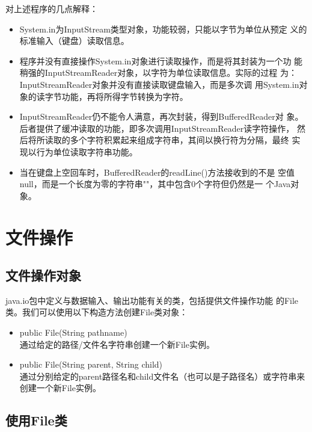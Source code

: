对上述程序的几点解释：

\begin{itemize}
\item System.in为InputStream类型对象，功能较弱，只能以字节为单位从预定
  义的标准输入（键盘）读取信息。
\item 程序并没有直接操作System.in对象进行读取操作，而是将其封装为一个功
  能稍强的InputStreamReader对象，以字符为单位读取信息。实际的过程
  为：{\kai InputStreamReader对象并没有直接读取键盘输入，而是多次调
    用System.in对象的读字节功能，再将所得字节转换为字符。}
\item InputStreamReader仍不能令人满意，再次封装，得到BufferedReader对
  象。后者提供了缓冲读取的功能，即多次调用InputStreamReader读字符操作，
  然后将所读取的多个字符积累起来组成字符串，其间以换行符为分隔，最终
  实现以行为单位读取字符串功能。
\item 当在键盘上空回车时，BufferedReader的readLine()方法接收到的不是
  空值null，而是一个长度为零的字符串""，其中包含0个字符但仍然是一
  个Java对象。
\end{itemize}

\section{文件操作}

\subsection{文件操作对象}

java.io包中定义与数据输入、输出功能有关的类，包括提供文件操作功能
的File类。我们可以使用以下构造方法创建File类对象：

\begin{itemize}
\item public File(String pathname)\\
  通过给定的路径/文件名字符串创建一个新File实例。
\item public File(String parent, String child)\\
  通过分别给定的parent路径名和child文件名（也可以是子路径名）或字符串来
  创建一个新File实例。
\end{itemize}

\subsection{使用File类}



